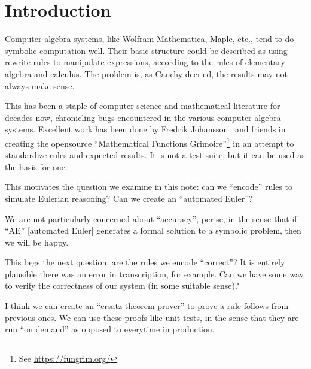 \chapter{Introduction}

\M
Computer algebra systems, like Wolfram Mathematica, Maple, etc., tend to
do symbolic computation well. Their basic structure could be described
as using rewrite rules to manipulate expressions, according to the rules
of elementary algebra and calculus. The problem is, as Cauchy decried,
the results may not always make sense.

This has been a staple of computer science and mathematical literature
for decades now, chronicling bugs encountered in the various computer
algebra systems. Excellent work has been done by Fredrik Johansson~\cite{johansson2020:fungrim} and
friends in creating the opensource ``Mathematical Functions
Grimoire''\footnote{See \url{https://fungrim.org/}} in an attempt to
standardize rules and expected results. It is not a test suite, but it
can be used as the basis for one.

This motivates the question we examine in this note: can we ``encode''
rules to simulate Eulerian reasoning? Can we create an ``automated Euler''?

\M
We are not particularly concerned about ``accuracy'', per se, in the
sense that if ``AE'' [automated Euler] generates a formal solution to a
symbolic problem, then we will be happy.

This begs the next question, are the rules we encode ``correct''? It is
entirely plausible there was an error in transcription, for example. Can
we have some way to verify the correctness of our system (in some
suitable sense)?

I think we can create an ``ersatz theorem prover'' to prove a rule
follows from previous ones. We can use these proofs like unit tests, in
the sense that they are run ``on demand'' as opposed to everytime in
production.

